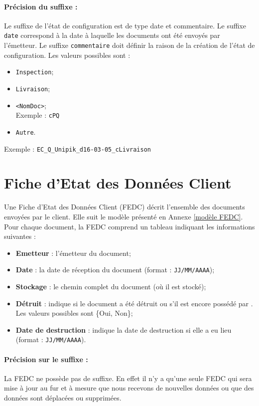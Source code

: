 \paragraph{Précision du suffixe :}
Le suffixe de l'état de configuration est de type date et commentaire. Le suffixe \verb+date+ correspond à la date à laquelle les documents ont été envoyés par l’émetteur. Le suffixe \verb+commentaire+ doit définir la raison de la création de l'état de configuration. Les valeurs possibles sont :
\begin{itemize}
\item \verb+Inspection+;
\item \verb+Livraison+;
\item \verb+<NomDoc>+; \\
Exemple : \verb+cPQ+
\item \verb+Autre+.
\end{itemize}
Exemple : \verb+EC_Q_Unipik_d16-03-05_cLivraison+

\section{Fiche d'Etat des Données Client}
\label{FEDC}

Une Fiche d'Etat des Données Client (FEDC) décrit l'ensemble des documents envoyées par le client. Elle suit le modèle présenté en Annexe \ref{modèle FEDC}. Pour chaque document, la FEDC comprend un tableau indiquant les informations suivantes :
\begin{itemize}
\item \textbf{Emetteur} : l'émetteur du document;
\item \textbf{Date} : la date de réception du document (format : \verb+JJ/MM/AAAA+);
\item \textbf{Stockage} : le chemin complet du document (où il est stocké);
\item \textbf{Détruit} : indique si le document a été détruit ou s'il est encore possédé par \nomEquipe. Les valeurs possibles sont \{Oui, Non\};
\item \textbf{Date de destruction} : indique la date de destruction si elle a eu lieu (format : \verb+JJ/MM/AAAA+).
\end{itemize}

\paragraph{Précision sur le suffixe :}
La FEDC ne possède pas de suffixe. En effet il n'y a qu'une seule FEDC qui sera mise à jour au fur et à mesure que nous recevons de nouvelles données ou que des données sont déplacées ou supprimées.